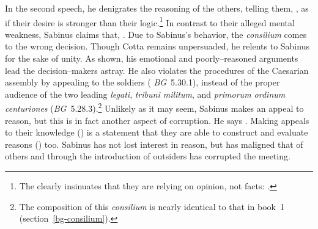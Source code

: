 \documentclass[12pt,letterpaper,oneside,final]{memoir}
\begin{document}
In the second speech, he denigrates the reasoning of the others, telling them, , as if their desire is stronger than their logic.\footnote{The  clearly insinuates that they are relying on opinion, not facts: .} In contrast to their alleged mental weakness, Sabinus claims that, . Due to Sabinus's behavior, the \emph{consilium} comes to the wrong decision. Though Cotta remains unpersuaded, he relents to Sabinus for the sake of unity. As shown, his emotional and poorly--reasoned arguments lead the decision--makers astray. He also violates the procedures of the Caesarian assembly by appealing to the soldiers (  \emph{BG}~5.30.1), instead of the proper audience of the two leading \emph{legati}, \emph{tribuni militum}, and \emph{primorum ordinum centuriones} (\emph{BG}~5.28.3).\footnote{The composition of this \emph{consilium} is nearly identical to that in book~1 (section~\ref{bg-consilium}).} Unlikely as it may seem, Sabinus makes an appeal to reason, but this is in fact another aspect of corruption. He says . Making appeals to their knowledge () is a statement that they are able to construct and evaluate reasons () too. Sabinus has not lost interest in reason, but has maligned that of others and through the introduction of outsiders has corrupted the meeting.
\end{document}
